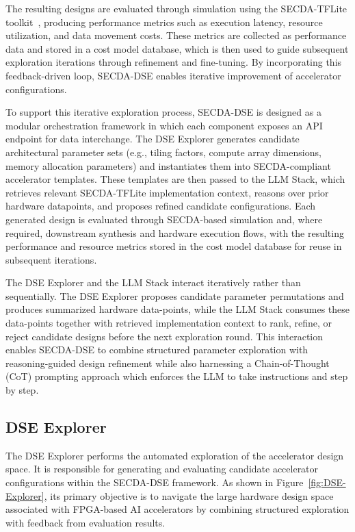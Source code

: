 The resulting designs are evaluated through simulation using the SECDA-TFLite toolkit~\cite{haris2023secda}, producing performance metrics such as execution latency, resource utilization, and data movement costs. These metrics are collected as performance data and stored in a cost model database, which is then used to guide subsequent exploration iterations through refinement and fine-tuning. By incorporating this feedback-driven loop, SECDA-DSE enables iterative improvement of accelerator configurations.

To support this iterative exploration process, SECDA-DSE is designed as a modular orchestration framework in which each component exposes an API endpoint for data interchange. The DSE Explorer generates candidate architectural parameter sets (e.g., tiling factors, compute array dimensions, memory allocation parameters) and instantiates them into SECDA-compliant accelerator templates. These templates are then passed to the LLM Stack, which retrieves relevant SECDA-TFLite implementation context, reasons over prior hardware datapoints, and proposes refined candidate configurations. Each generated design is evaluated through SECDA-based simulation and, where required, downstream synthesis and hardware execution flows, with the resulting performance and resource metrics stored in the cost model database for reuse in subsequent iterations.


The DSE Explorer and the LLM Stack interact iteratively rather than sequentially. The DSE Explorer proposes candidate parameter permutations and produces summarized hardware data-points, while the LLM Stack consumes these data-points together with retrieved implementation context to rank, refine, or reject candidate designs before the next exploration round. This interaction enables SECDA-DSE to combine structured parameter exploration with reasoning-guided design refinement while also harnessing a Chain-of-Thought (CoT) prompting approach which enforces the LLM to take instructions and step by step.



\subsection{DSE Explorer}

The DSE Explorer performs the automated exploration of the accelerator design space.
It is responsible for generating and evaluating candidate accelerator configurations within the SECDA-DSE framework. As shown in Figure~\ref{fig:DSE-Explorer}, its primary objective is to navigate the large hardware design space associated with FPGA-based AI accelerators by combining structured exploration with feedback from evaluation results.

